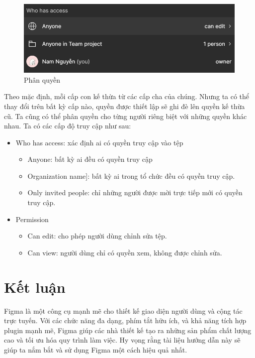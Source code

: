 \documentclass[11pt]{article}
\begin{document}
\begin{figure}[!h]
    \centering
    \includegraphics[width=1\linewidth]{imgs/4.png}
    \caption{Phân quyền}
\end{figure}

Theo mặc định, mỗi cấp con kế thừa từ các cấp cha của chúng. Nhưng ta có thể thay đổi trên bất kỳ cấp nào, quyền được thiết lập sẽ ghi đè lên quyền kế thừa cũ. Ta cũng có thể phân quyền cho từng người riêng biệt với những quyền khác nhau. Ta có các cấp độ truy cập như sau:

\begin{itemize}
    \item Who has access: xác định ai có quyền truy cập vào tệp
          \begin{itemize}
              \item Anyone: bất kỳ ai đều có quyền truy cập
              \item Organization name]: bất kỳ ai trong tổ chức đều có quyền truy cập.
              \item Only invited people: chỉ những người được mời trực tiếp mới có quyền truy cập.
          \end{itemize}

    \item Permission
          \begin{itemize}
              \item Can edit: cho phép người dùng chỉnh sửa tệp.
              \item Can view: người dùng chỉ có quyền xem, không được chỉnh sửa.
          \end{itemize}
\end{itemize}


\section{Kết luận}
Figma là một công cụ mạnh mẽ cho thiết kế giao diện người dùng và cộng tác trực tuyến. Với các chức năng đa dạng, phím tắt hữu ích, và khả năng tích hợp plugin mạnh mẽ, Figma giúp các nhà thiết kế tạo ra những sản phẩm chất lượng cao và tối ưu hóa quy trình làm việc. Hy vọng rằng tài liệu hướng dẫn này sẽ giúp ta nắm bắt và sử dụng Figma một cách hiệu quả nhất.




\end{document}

